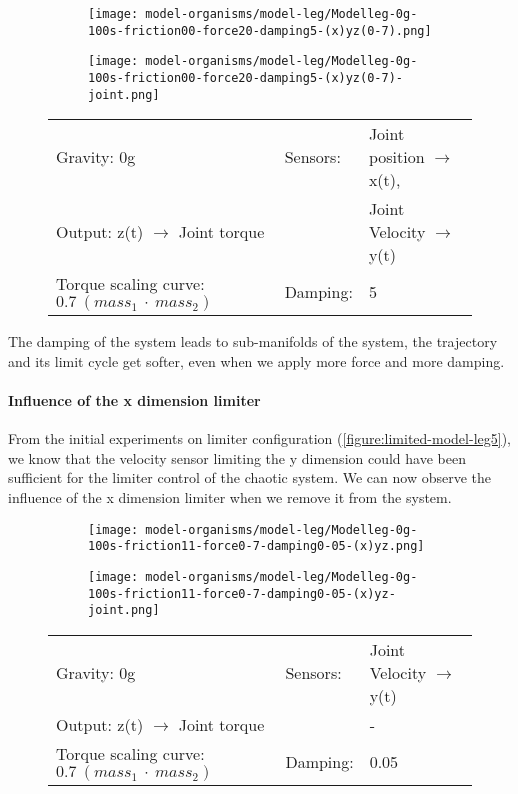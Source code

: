 \documentclass[main]{subfiles}
\begin{document}
\begin{figure}[H]
	\centering
		\begin{subfigure}[c]{0.45\textwidth}
	\texttt{[image: model-organisms/model-leg/Modelleg-0g-100s-friction00-force20-damping5-(x)yz(0-7).png]}
		\end{subfigure}
	\begin{subfigure}[c]{0.45\textwidth}
	\texttt{[image: model-organisms/model-leg/Modelleg-0g-100s-friction00-force20-damping5-(x)yz(0-7)-joint.png]}
		\end{subfigure}
	\caption[Limited chaotic controller controlling model leg]{}
	\begin{tabular}{l|ll}
	\hline 
	Gravity: 0g  & Sensors: & Joint position \(\rightarrow\) x(t),\\
	 Output: z(t) \(\rightarrow\) Joint torque &  & Joint Velocity \(\rightarrow\) y(t) \\
	  Torque scaling curve: \(0.7~(mass_1~\cdot~mass_2)\) & Damping: & 5 \\
	  \hline
	\end{tabular}

	\label{figure:limited-damped-model-leg-damping4}
\end{figure}

The damping of the system leads to sub-manifolds of the system, the trajectory and its limit cycle get softer, even when we apply more force and more damping.

\paragraph{Influence of the x dimension limiter} From the initial experiments on limiter configuration (\ref{figure:limited-model-leg5}), we know that the velocity sensor limiting the y dimension could have been sufficient for the limiter control of the chaotic system. We can now observe the influence of the x dimension limiter when we remove it from the system.

\begin{figure}[H]
	\centering
		\begin{subfigure}[c]{0.45\textwidth}
	\texttt{[image: model-organisms/model-leg/Modelleg-0g-100s-friction11-force0-7-damping0-05-(x)yz.png]}
		\end{subfigure}
	\begin{subfigure}[c]{0.45\textwidth}
	\texttt{[image: model-organisms/model-leg/Modelleg-0g-100s-friction11-force0-7-damping0-05-(x)yz-joint.png]}
		\end{subfigure}
	\caption[Limited chaotic controller controlling model leg]{}
	\begin{tabular}{l|ll}
	\hline 
	Gravity: 0g  & Sensors: & Joint Velocity \(\rightarrow\) y(t)\\
	 Output: z(t) \(\rightarrow\) Joint torque & & - \\
	  Torque scaling curve: \(0.7~(mass_1~\cdot~mass_2)\) & Damping: & 0.05 \\
	  \hline
	\end{tabular}

	\label{figure:limited-damped-model-leg4}
\end{figure}
\end{document}

